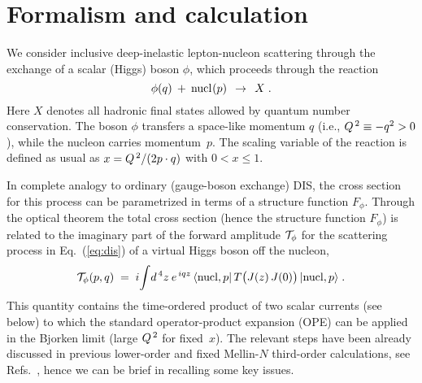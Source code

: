 \documentclass[12pt]{article}
\newcommand{\beq}{\begin{equation}}
\newcommand{\eeq}{\end{equation}}
\newcommand{\ra}{\rightarrow}
\begin{document}
\section{Formalism and calculation} 
\label{sec:formalism}
%
%
We consider inclusive deep-inelastic lepton-nucleon scattering through the 
exchange of a  scalar (Higgs) boson $\phi$, which proceeds through the reaction
%
\beq
\label{eq:dis}
  \phi(q) \:+\: {\rm nucl}\:\! (p) \:\:\ra\:\: X\; .
\eeq
%
Here $X$ denotes all hadronic final states allowed by quantum number 
conservation. The boson $\phi$ transfers a space-like momentum $q$ 
(i.e., ${Q^{\, 2}} \equiv -q^2 > 0$), while the nucleon carries momentum~$p$. 
The scaling variable of the reaction is defined as usual as 
$x={Q^{\, 2}} / (2p\cdot q)$ with $0 < x \leq 1$.

In complete analogy to ordinary (gauge-boson exchange) DIS, the cross section 
for this process can be parametrized in terms of a structure function $F_\phi$.
Through the optical theorem the total cross section (hence the structure
function $F_\phi$) is related to the imaginary part of the forward amplitude 
${\cal T}_\phi$ for the scattering process in Eq.~(\ref{eq:dis}) of a virtual 
Higgs boson off the nucleon,
%
\beq
\label{eq:T}
  {\cal T}_\phi(p,q) \; = \; i \! \int \! d^{\, 4}z \: e^{\,iqz} \,
  \langle {\rm nucl,}\, p \vert \, T \big(J(z) \, J(0)\big) \, 
  \vert {\rm nucl,}\, p \rangle \; .
\eeq
%
This quantity contains the time-ordered product of two scalar currents (see 
below) to which the standard operator-product expansion (OPE) can be applied 
in the Bjorken limit (large ${Q^{\, 2}}$ for fixed~$x$).
The relevant steps have been already discussed in previous lower-order 
and fixed Mellin-$N$ third-order calculations, see Refs.~\cite
{Mom3loop,Moch:1999eb}, hence we can be brief in recalling some key issues.
\end{document}
